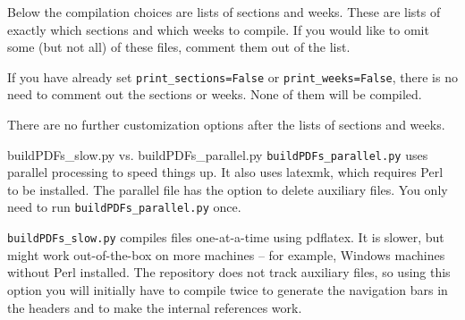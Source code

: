 \documentclass[10pt]{beamer}
\begin{document}
\begin{frame}
Below the compilation choices are lists of sections and weeks. These are lists of exactly which sections and which weeks to compile. If you would like to omit some (but not all) of these files, comment them out of the list.\vfill

If you have already set \texttt{print\_sections=False} or \texttt{print\_weeks=False}, there is no need to comment out the sections or weeks. None of them will be compiled.
\vfill

There are no further customization options after the lists of sections and weeks.
\end{frame}

\begin{frame}{{buildPDFs\_slow.py} vs. {buildPDFs\_parallel.py}}
\texttt{buildPDFs\_parallel.py} uses parallel processing to speed things up. It also uses latexmk, which requires Perl to be installed. The parallel file has the option to delete auxiliary files. You only need to run \texttt{buildPDFs\_parallel.py} once.
\vfill

\texttt{buildPDFs\_slow.py} compiles files one-at-a-time using pdflatex. It is slower, but might work out-of-the-box on more machines -- for example, Windows machines without Perl installed. The repository does not track auxiliary files, so using this option you will initially have to compile twice to generate the navigation bars in the headers and to make the internal references work.
\end{frame}

\end{document}
